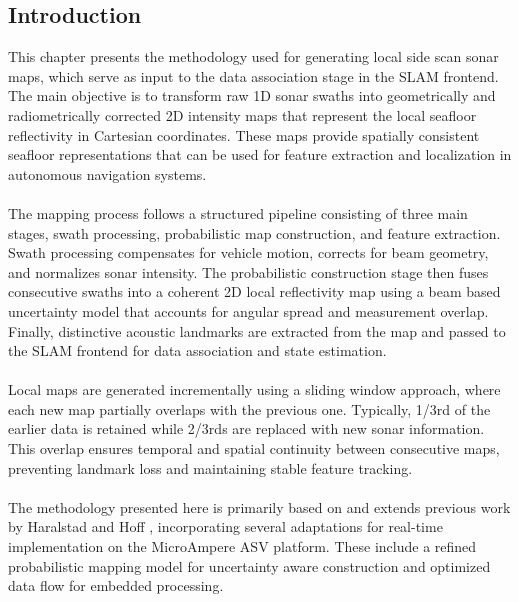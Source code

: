 \subsection{Introduction}
This chapter presents the methodology used for generating local side scan sonar maps, which serve as input to the data association stage in the SLAM frontend. The main objective is to transform raw 1D sonar swaths into geometrically and radiometrically corrected 2D intensity maps that represent the local seafloor reflectivity in Cartesian coordinates. These maps provide spatially consistent seafloor representations that can be used for feature extraction and localization in autonomous navigation systems.  
\\ \\
The mapping process follows a structured pipeline consisting of three main stages, swath processing, probabilistic map construction, and feature extraction. Swath processing compensates for vehicle motion, corrects for beam geometry, and normalizes sonar intensity. The probabilistic construction stage then fuses consecutive swaths into a coherent 2D local reflectivity map using a beam based uncertainty model that accounts for angular spread and measurement overlap. Finally, distinctive acoustic landmarks are extracted from the map and passed to the SLAM frontend for data association and state estimation.  
\\ \\
Local maps are generated incrementally using a sliding window approach, where each new map partially overlaps with the previous one. Typically, 1/3rd of the earlier data is retained while 2/3rds are replaced with new sonar information. This overlap ensures temporal and spatial continuity between consecutive maps, preventing landmark loss and maintaining stable feature tracking.  
\\ \\
The methodology presented here is primarily based on and extends previous work by Haralstad \cite{side_scan_sonar_master_thesis} and Hoff \cite{side_scan_sonar_paper}, incorporating several adaptations for real-time implementation on the MicroAmpere ASV platform. These include a refined probabilistic mapping model for uncertainty aware construction and optimized data flow for embedded processing.


